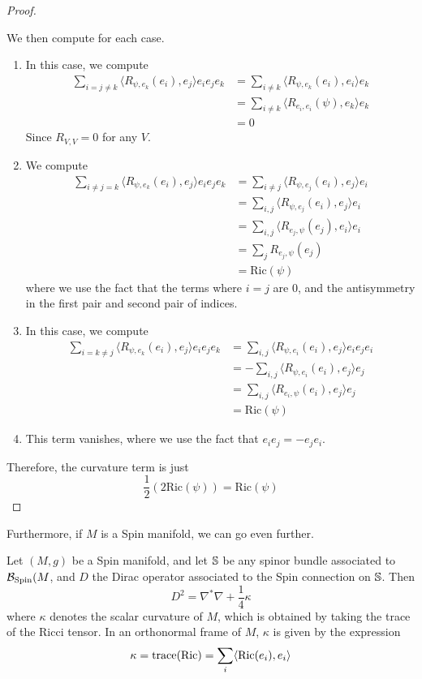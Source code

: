 \begin{proof}
\begin{enumerate}
\end{enumerate}
We then compute for each case.
\begin{enumerate}
  \item In this case, we compute
  \begin{align*}
  \sum_{i =j \neq k}\langle R_{\psi,e_k}(e_i), e_j\rangle e_ie_je_k
  &= \sum_{i \neq k} \langle R_{\psi,e_k}(e_i), e_i\rangle e_k \\
  &= \sum_{i \neq k} \langle R_{e_i,e_i}(\psi), e_k\rangle e_k \\
  &= 0
  \end{align*}
  Since $R_{V,V} = 0$ for any $V$.
  \item We compute
  \begin{align*}
  \sum_{i \neq j = k}\langle R_{\psi,e_k}(e_i), e_j\rangle e_ie_je_k
  &= \sum_{i \neq j} \langle R_{\psi, e_j}(e_i), e_j\rangle e_i \\
  &= \sum_{i,j} \langle R_{\psi, e_j}(e_i), e_j \rangle e_i \\
  &= \sum_{i,j} \langle R_{e_j, \psi}(e_j),e_i \rangle e_i \\
  &= \sum_{j} R_{e_j, \psi}(e_j) \\
  &= \mathrm{Ric}(\psi)
  \end{align*}
  where we use the fact that the terms where $i = j$ are $0$, and the antisymmetry
  in the first pair and second pair of indices.
  \item In this case, we compute
  \begin{align*}
  \sum_{i = k \neq j}\langle R_{\psi,e_k}(e_i), e_j\rangle e_ie_je_k
  &= \sum_{i,j} \langle R_{\psi, e_i}(e_i), e_j \rangle e_ie_je_i \\
  &= -\sum_{i,j} \langle R_{\psi, e_i}(e_i), e_j \rangle e_j \\
  &= \sum_{i,j} \langle R_{e_i, \psi}(e_i) , e_j \rangle e_j \\
  &= \mathrm{Ric}(\psi)
  \end{align*}
  \item This term vanishes, where we use the fact that $e_ie_j = -e_je_i$.
\end{enumerate}
Therefore, the curvature term is just
\[
\frac{1}{2} \left( 2\mathrm{Ric}(\psi) \right) = \mathrm{Ric}(\psi)
\]
\end{proof}
%
Furthermore, if $M$ is a Spin manifold, we can go even further.
%
\begin{thm}[\ib{Lichnerowicz}]
Let $(M,g)$ be a Spin manifold, and let $\S$ be any spinor bundle associated to
$\B_{\Spin}(M$, and $D$ the Dirac operator associated to the Spin connection on $\S$.
Then
\[
D^2 = \nabla^*\nabla + \frac{1}{4}\kappa
\]
where $\kappa$ denotes the scalar curvature of $M$, which is obtained by taking
the trace of the Ricci tensor. In an orthonormal frame of $M$, $\kappa$ is given by
the expression
\[
\kappa = \trace(\mathrm{Ric}) = \sum_{i} \langle \mathrm{Ric}(e_i), e_i \rangle
\]
\end{thm}

